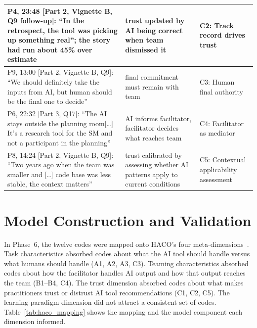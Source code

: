 \documentclass[a4paper,twoside]{bth}
\begin{document}
\begin{longtable}{L{5.6cm} L{3.1cm} L{2.9cm}}
\midrule
P4, 23:48 [Part 2, Vignette B, Q9 follow-up]: ``In the retrospect, the tool was picking up something real''; the story had run about 45\% over estimate & trust updated by AI being correct when team dismissed it & C2: Track record drives trust \\
\midrule
P9, 13:00 [Part 2, Vignette B, Q9]: ``We should definitely take the inputs from AI, but human should be the final one to decide'' & final commitment must remain with team & C3: Human final authority \\
\midrule
P6, 22:32 [Part 3, Q17]: ``The AI stays outside the planning room{[}\ldots{]} It's a research tool for the SM and not a participant in the planning'' & AI informs facilitator, facilitator decides what reaches team & C4: Facilitator as mediator \\
\midrule
P8, 14:24 [Part 2, Vignette B, Q9]: ``Two years ago when the team was smaller and {[}\ldots{]} code base was less stable, the context matters'' & trust calibrated by assessing whether AI patterns apply to current conditions & C5: Contextual applicability assessment \\
\bottomrule
\end{longtable}

\section{Model Construction and Validation}
\label{sec:model_construction}

In Phase~6, the twelve codes were mapped onto HACO's four meta-dimensions~\cite{dubey2020haco}. Task characteristics absorbed codes about what the AI tool should handle versus what humans should handle (A1, A2, A3, C3). Teaming characteristics absorbed codes about how the facilitator handles AI output and how that output reaches the team (B1--B4, C4). The trust dimension absorbed codes about what makes practitioners trust or distrust AI tool recommendations (C1, C2, C5). The learning paradigm dimension did not attract a consistent set of codes. Table~\ref{tab:haco_mapping} shows the mapping and the model component each dimension informed.
\end{document}
